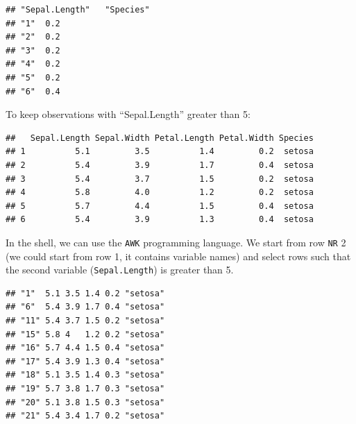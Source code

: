 \documentclass[]{book}
\newenvironment{Shaded}{\begin{snugshade}}{\end{snugshade}}
\newcommand{\KeywordTok}[1]{\textcolor[rgb]{0.13,0.29,0.53}{\textbf{#1}}}
\newcommand{\DecValTok}[1]{\textcolor[rgb]{0.00,0.00,0.81}{#1}}
\newcommand{\StringTok}[1]{\textcolor[rgb]{0.31,0.60,0.02}{#1}}
\newcommand{\FunctionTok}[1]{\textcolor[rgb]{0.00,0.00,0.00}{#1}}
\newcommand{\OperatorTok}[1]{\textcolor[rgb]{0.81,0.36,0.00}{\textbf{#1}}}
\newcommand{\NormalTok}[1]{#1}
\theoremstyle{definition}
\theoremstyle{definition}
\theoremstyle{definition}
\theoremstyle{remark}
\begin{document}
\begin{verbatim}
## "Sepal.Length"   "Species"
## "1"  0.2
## "2"  0.2
## "3"  0.2
## "4"  0.2
## "5"  0.2
## "6"  0.4
\end{verbatim}

To keep observations with ``Sepal.Length'' greater than 5:

\begin{Shaded}
\end{Shaded}

\begin{verbatim}
##   Sepal.Length Sepal.Width Petal.Length Petal.Width Species
## 1          5.1         3.5          1.4         0.2  setosa
## 2          5.4         3.9          1.7         0.4  setosa
## 3          5.4         3.7          1.5         0.2  setosa
## 4          5.8         4.0          1.2         0.2  setosa
## 5          5.7         4.4          1.5         0.4  setosa
## 6          5.4         3.9          1.3         0.4  setosa
\end{verbatim}

In the shell, we can use the \texttt{AWK} programming language. We start
from row \texttt{NR} 2 (we could start from row 1, it contains variable
names) and select rows such that the second variable
(\texttt{Sepal.Length}) is greater than 5.

\begin{Shaded}
\end{Shaded}

\begin{verbatim}
## "1"  5.1 3.5 1.4 0.2 "setosa"
## "6"  5.4 3.9 1.7 0.4 "setosa"
## "11" 5.4 3.7 1.5 0.2 "setosa"
## "15" 5.8 4   1.2 0.2 "setosa"
## "16" 5.7 4.4 1.5 0.4 "setosa"
## "17" 5.4 3.9 1.3 0.4 "setosa"
## "18" 5.1 3.5 1.4 0.3 "setosa"
## "19" 5.7 3.8 1.7 0.3 "setosa"
## "20" 5.1 3.8 1.5 0.3 "setosa"
## "21" 5.4 3.4 1.7 0.2 "setosa"
\end{verbatim}
\end{document}
